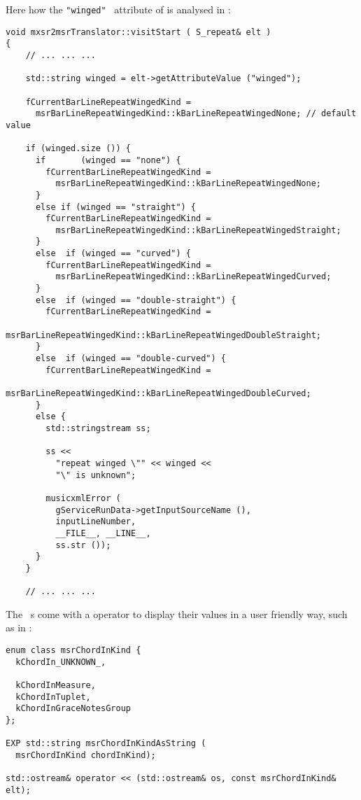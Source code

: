 Here how the {\tt "winged"} \mxml\ attribute of  is analysed in {\tt }:%
\begin{lstlisting}[language=CPlusPlus]
void mxsr2msrTranslator::visitStart ( S_repeat& elt )
{
    // ... ... ...

    std::string winged = elt->getAttributeValue ("winged");

    fCurrentBarLineRepeatWingedKind =
      msrBarLineRepeatWingedKind::kBarLineRepeatWingedNone; // default value

    if (winged.size ()) {
      if       (winged == "none") {
        fCurrentBarLineRepeatWingedKind =
          msrBarLineRepeatWingedKind::kBarLineRepeatWingedNone;
      }
      else if (winged == "straight") {
        fCurrentBarLineRepeatWingedKind =
          msrBarLineRepeatWingedKind::kBarLineRepeatWingedStraight;
      }
      else  if (winged == "curved") {
        fCurrentBarLineRepeatWingedKind =
          msrBarLineRepeatWingedKind::kBarLineRepeatWingedCurved;
      }
      else  if (winged == "double-straight") {
        fCurrentBarLineRepeatWingedKind =
          msrBarLineRepeatWingedKind::kBarLineRepeatWingedDoubleStraight;
      }
      else  if (winged == "double-curved") {
        fCurrentBarLineRepeatWingedKind =
          msrBarLineRepeatWingedKind::kBarLineRepeatWingedDoubleCurved;
      }
      else {
        std::stringstream ss;

        ss <<
          "repeat winged \"" << winged <<
          "\" is unknown";

        musicxmlError (
          gServiceRunData->getInputSourceName (),
          inputLineNumber,
          __FILE__, __LINE__,
          ss.str ());
      }
    }

    // ... ... ...
\end{lstlisting}

The \mf\ \enumType s come with a \code{$<$$<$} operator to display their values in a user friendly way, such as  in :
\begin{lstlisting}[language=CPlusPlus]
enum class msrChordInKind {
  kChordIn_UNKNOWN_,

  kChordInMeasure,
  kChordInTuplet,
  kChordInGraceNotesGroup
};

EXP std::string msrChordInKindAsString (
  msrChordInKind chordInKind);

std::ostream& operator << (std::ostream& os, const msrChordInKind& elt);
\end{lstlisting}

